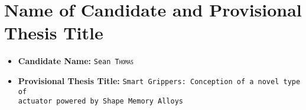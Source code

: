 \section{Name of Candidate and Provisional Thesis Title}\label{sec:name_title}
\begin{itemize}
  \item[] \textbf{Candidate Name:} \texttt{Sean \textsc{Thomas} }
  \item[] \textbf{Provisional Thesis Title:} \texttt{Smart Grippers: Conception of a novel type of \\
  actuator powered by Shape Memory Alloys}
\end{itemize}
